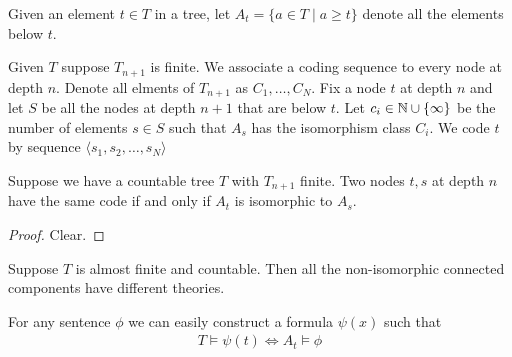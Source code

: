 \documentclass{amsart}
\begin{document}
\begin{Definition}
	Given an element $t \in T$ in a tree, let $A_t = \{a \in T \mid a \geq t\}$ denote all the elements below $t$.
\end{Definition}

\begin{Definition} \label{df_coding}
	Given $T$ suppose $T_{n+1}$ is finite. We associate a coding sequence to every node at depth $n$.
	Denote all elments of $T_{n+1}$ as $C_1, \ldots, C_N$.
	Fix a node $t$ at depth $n$ and let $S$ be all the nodes at depth $n+1$ that are below $t$.
	Let $c_i \in \mathbb{N} \cup \{\infty\}$ be the number of elements $s \in S$ such that $A_s$ has the isomorphism class $C_i$.
	We code $t$ by sequence $\langle s_1, s_2, \ldots, s_N \rangle$
\end{Definition}


\begin{Lemma} \label{lm_tree_code}
	Suppose we have a countable tree $T$ with $T_{n+1}$ finite. Two nodes $t,s$ at depth $n$ have the same code if and only if $A_t$ is isomorphic to $A_s$.
\end{Lemma}

\begin{proof}
	Clear.
\end{proof}

\begin{Lemma} \label{lm_categoricity}
	Suppose $T$ is almost finite and countable. Then all the non-isomorphic connected components have different theories.
\end{Lemma}

\begin{Note}
	For any sentence $\phi$ we can easily construct a formula $\psi(x)$ such that
	\begin{align*}
		T \models \psi(t) \iff A_t \models \phi
	\end{align*}
\end{Note}
\end{document}
